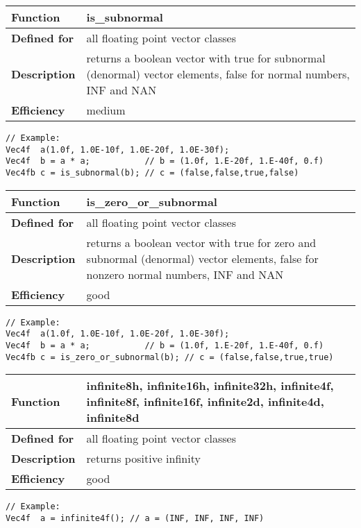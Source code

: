\documentclass[vcl_manual.tex]{subfiles}
\begin{document}
\begin{tabular}{|p{25mm}|p{100mm}|}
\hline
\bfseries Function & is\_subnormal \\ \hline
\bfseries Defined for & all floating point vector classes \\ \hline
\bfseries Description & returns a boolean vector with true for subnormal (denormal) vector elements, false for normal numbers, INF and NAN \\ \hline
\bfseries Efficiency & medium \\ \hline
\end{tabular}
\begin{lstlisting}[frame=none]
// Example:
Vec4f  a(1.0f, 1.0E-10f, 1.0E-20f, 1.0E-30f);
Vec4f  b = a * a;           // b = (1.0f, 1.E-20f, 1.E-40f, 0.f)
Vec4fb c = is_subnormal(b); // c = (false,false,true,false)
\end{lstlisting}


\begin{tabular}{|p{25mm}|p{100mm}|}
\hline
\bfseries Function & is\_zero\_or\_subnormal \\ \hline
\bfseries Defined for & all floating point vector classes \\ \hline
\bfseries Description & returns a boolean vector with true for zero and subnormal (denormal) vector elements, false for nonzero normal numbers, INF and NAN \\ \hline
\bfseries Efficiency & good \\ \hline
\end{tabular}
\begin{lstlisting}[frame=none]
// Example:
Vec4f  a(1.0f, 1.0E-10f, 1.0E-20f, 1.0E-30f);
Vec4f  b = a * a;           // b = (1.0f, 1.E-20f, 1.E-40f, 0.f)
Vec4fb c = is_zero_or_subnormal(b); // c = (false,false,true,true)
\end{lstlisting}


\begin{tabular}{|p{25mm}|p{100mm}|}
\hline
\bfseries Function & 
infinite8h, infinite16h, infinite32h, \newline
infinite4f, infinite8f, infinite16f, \newline
infinite2d, infinite4d, infinite8d \\ \hline
\bfseries Defined for & all floating point vector classes \\ \hline
\bfseries Description & returns positive infinity \\ \hline
\bfseries Efficiency & good \\ \hline
\end{tabular}
\begin{lstlisting}[frame=none]
// Example:
Vec4f  a = infinite4f(); // a = (INF, INF, INF, INF)
\end{lstlisting}
\end{document}
